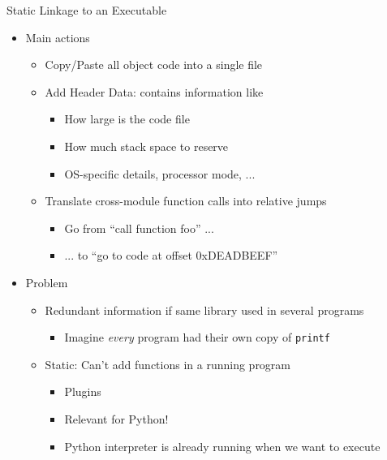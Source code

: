 
\begin{frame}{Static Linkage to an Executable}
%
\begin{itemize}
\item Main actions
	\begin{itemize}
	\item Copy/Paste all object code into a single file
	\item Add Header Data: contains information like
		\begin{itemize}
		\item How large is the code file
		\item How much stack space to reserve
		\item OS-specific details, processor mode, ...
		\end{itemize}
	\item Translate cross-module function calls into relative jumps
		\begin{itemize}
		\item Go from \enquote{call function foo} ...
		\item ... to \enquote{go to code at offset 0xDEADBEEF}
		\end{itemize}
	\end{itemize}
\item Problem
	\begin{itemize}
	\item Redundant information if same library used in several programs 
		\begin{itemize}
		\item Imagine \emph{every} program had their own copy of \texttt{printf}
		\end{itemize}
	\item Static: Can't add functions in a running program
		\begin{itemize}
		\item Plugins
		\item Relevant for Python!
		\item Python interpreter is already running when we want to execute 
		\end{itemize}
	\end{itemize}
\end{itemize}
%
\end{frame}


